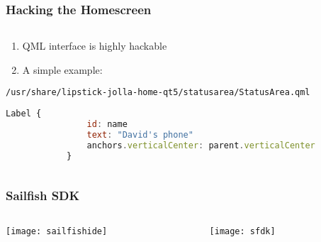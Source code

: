 \documentclass[
	notes=none,
	aspectratio=169
]{beamer}
\begin{document}
\begin{frame}[fragile]
\frametitle{Hacking the Homescreen}

\begin{columns}[T]
\begin{column}[T]{1.0\textwidth}
\setlength{\parskip}{0.5em}

\vspace{0.4cm}
\begin{enumerate}
\setlength{\parskip}{0.5em}
\item QML interface is highly hackable
\item A simple example:
\end{enumerate}

{\tt /usr/share/lipstick-jolla-home-qt5/statusarea/StatusArea.qml}
\vspace{0.2cm}
\begin{lstlisting}[language=QML,firstnumber=141]
            Label {
                id: name
                text: "David's phone"
                anchors.verticalCenter: parent.verticalCenter
            }
\end{lstlisting}



\end{column}
\end{columns}

\end{frame}
\note{
}


\begin{frame}
\frametitle{Sailfish SDK}

\begin{columns}[T]
\begin{column}[T]{0.5\textwidth}
\setlength{\parskip}{0.5em}

\vspace{0.3cm}
\hspace{0.1cm}
\texttt{[image: sailfishide]}

\end{column}
\begin{column}[T]{0.5\textwidth}
\setlength{\parskip}{0.5em}

\vspace{0.3cm}
\texttt{[image: sfdk]}

\end{column}
\end{columns}

\end{frame}
\note{
}
\end{document}
